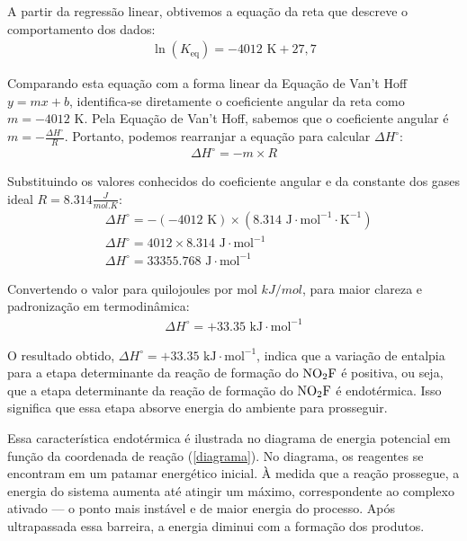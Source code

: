 A partir da regressão linear, obtivemos a equação da reta que descreve o comportamento dos dados:
\begin{align*}
\ln(K_\text{eq}) = -4012 \text{ K} + 27,7
\end{align*}

Comparando esta equação com a forma linear da Equação de Van't Hoff \(y = mx + b\), identifica-se diretamente o coeficiente angular da reta como \(m = -4012 \text{ K}\). Pela Equação de Van't Hoff, sabemos que o coeficiente angular é \(m = -\frac{\Delta H^\circ}{R}\). Portanto, podemos rearranjar a equação para calcular \(\Delta H^\circ\):
\begin{align*}
    \Delta H^\circ = -m \times R
\end{align*}

Substituindo os valores conhecidos do coeficiente angular e da constante dos gases ideal \(R = 8.314 \frac{J}{mol.K}\):
\begin{align*}
& \Delta H^\circ = -(-4012 \text{ K}) \times (8.314 \text{ J} \cdot \text{mol}^{-1} \cdot \text{K}^{-1}) \\
& \Delta H^\circ = 4012 \times 8.314 \text{ J} \cdot \text{mol}^{-1} \\
& \Delta H^\circ = 33355.768 \text{ J} \cdot \text{mol}^{-1}
\end{align*}

Convertendo o valor para quilojoules por mol \(kJ/mol\), para maior clareza e padronização em termodinâmica:
\begin{align*}
    \Delta H^\circ = +33.35 \text{ kJ} \cdot \text{mol}^{-1}
\end{align*}

O resultado obtido, $\Delta H^\circ = +33.35 \text{ kJ} \cdot \text{mol}^{-1}$, indica que a variação de entalpia para a etapa determinante da reação de formação do $\ce{NO2F}$ é positiva, ou seja, que a etapa determinante da reação de formação do $\ce{NO2F}$ é endotérmica. Isso significa que essa etapa absorve energia do ambiente para prosseguir.

Essa característica endotérmica é ilustrada no diagrama de energia potencial em função da coordenada de reação (\cref{diagrama}). No diagrama, os reagentes se encontram em um patamar energético inicial. À medida que a reação prossegue, a energia do sistema aumenta até atingir um máximo, correspondente ao complexo ativado — o ponto mais instável e de maior energia do processo. Após ultrapassada essa barreira, a energia diminui com a formação dos produtos.

